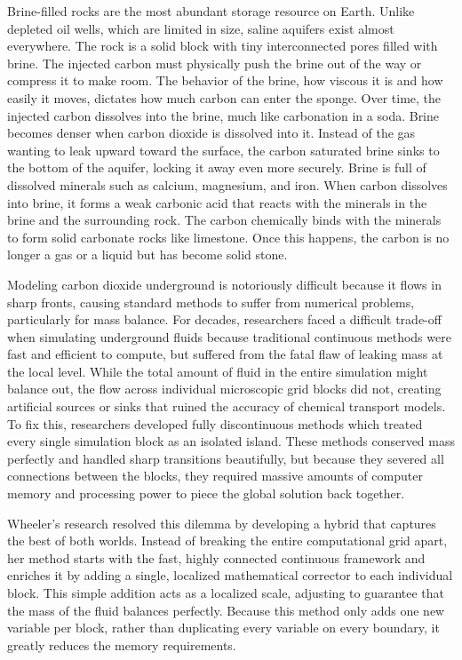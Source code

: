 Brine-filled rocks are the most abundant storage resource on Earth. Unlike depleted oil wells, which are limited in size, saline aquifers exist almost everywhere. The rock is a solid block with tiny interconnected pores filled with brine. The injected carbon must physically push the brine out of the way or compress it to make room. The behavior of the brine, how viscous it is and how easily it moves, dictates how much carbon can enter the sponge. Over time, the injected carbon dissolves into the brine, much like carbonation in a soda. Brine becomes denser when carbon dioxide is dissolved into it. Instead of the gas wanting to leak upward toward the surface, the carbon saturated brine sinks to the bottom of the aquifer, locking it away even more securely. Brine is full of dissolved minerals such as calcium, magnesium, and iron. When carbon dissolves into brine, it forms a weak carbonic acid that reacts with the minerals in the brine and the surrounding rock. The carbon chemically binds with the minerals to form solid carbonate rocks like limestone. Once this happens, the carbon is no longer a gas or a liquid but has become solid stone.

Modeling carbon dioxide underground is notoriously difficult because it flows in sharp fronts, causing standard methods to suffer from numerical problems, particularly for mass balance. For decades, researchers faced a difficult trade-off when simulating underground fluids because traditional continuous methods were fast and efficient to compute, but suffered from the fatal flaw of leaking mass at the local level. While the total amount of fluid in the entire simulation might balance out, the flow across individual microscopic grid blocks did not, creating artificial sources or sinks that ruined the accuracy of chemical transport models. To fix this, researchers developed fully discontinuous methods which treated every single simulation block as an isolated island. These methods conserved mass perfectly and handled sharp transitions beautifully, but because they severed all connections between the blocks, they required massive amounts of computer memory and processing power to piece the global solution back together.

Wheeler’s research resolved this dilemma by developing a hybrid that captures the best of both worlds. Instead of breaking the entire computational grid apart, her method starts with the fast, highly connected continuous framework and enriches it by adding a single, localized mathematical corrector to each individual block. This simple addition acts as a localized scale, adjusting to guarantee that the mass of the fluid balances perfectly. Because this method only adds one new variable per block, rather than duplicating every variable on every boundary, it greatly reduces the memory requirements.

